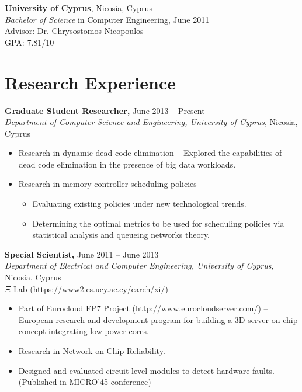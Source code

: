 \documentclass[11pt]{myres} %
\begin{document}
\begin{resume}
	{\color{blue}\textbf{University of Cyprus}, Nicosia, Cyprus} \\
	\emph{Bachelor of Science} in Computer Engineering, June 2011 \\
	Advisor: Dr. Chrysostomos Nicopoulos \\
	GPA: 7.81/10
 
\section{Research Experience}

{\color{blue}\textbf{Graduate Student Researcher,} June 2013 -- Present} \\
\emph{Department of Computer Science and Engineering, University of Cyprus}, Nicosia, Cyprus \\
\begin{itemize} \itemsep -2pt
    \item Research in dynamic dead code elimination -- Explored the capabilities of dead code elimination in the presence of big data workloads.
    \item Research in memory controller scheduling policies 
    \begin{itemize}
        \item Evaluating existing policies under new technological trends.
        \item Determining the optimal metrics to be used for scheduling policies via statistical analysis and queueing networks theory.
    \end{itemize}
\end{itemize}

{\color{blue}\textbf{Special Scientist,} June 2011 -- June 2013} \\
\emph{Department of Electrical and Computer Engineering, University of Cyprus}, Nicosia, Cyprus \\
$\Xi$ Lab (https://www2.cs.ucy.ac.cy/carch/xi/) \\
\begin{itemize} \itemsep -2pt
	\item Part of Eurocloud FP7 Project (http://www.eurocloudserver.com/) -- European research and development program for building a 3D server-on-chip concept integrating low power cores.
	\item Research in Network-on-Chip Reliability.
	\item Designed and evaluated circuit-level modules to detect hardware faults. (Published in MICRO'45 conference)
\end{itemize}


\end{resume}
\end{document}
